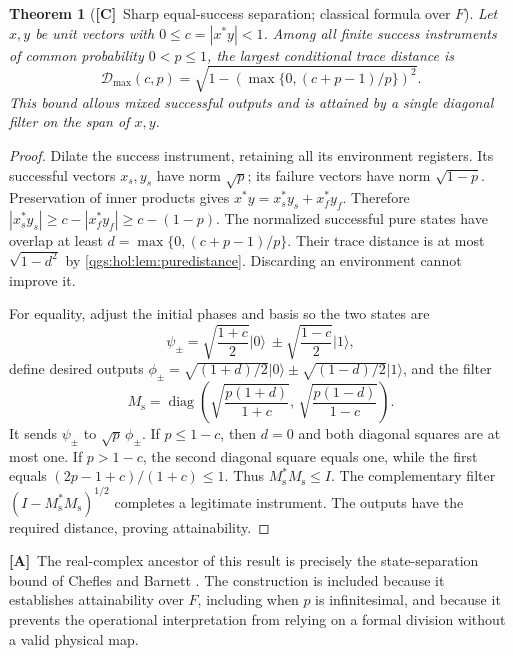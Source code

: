 \documentclass[11pt,oneside]{article}
\numberwithin{equation}{section}
\theoremstyle{plain}
\newtheorem{theorem}{Theorem}[section]
\theoremstyle{definition}
\theoremstyle{remark}
\newcommand{\TD}{\mathcal D}
\DeclareMathOperator{\diag}{diag}
\newcommand{\abs}[1]{\left|#1\right|}
\newcommand{\ket}[1]{\lvert#1\rangle}
\newcommand{\TC}{\textcolor{TierC}{\textsf{\bfseries[C]}}}
\newcommand{\TA}{\textcolor{TierA}{\textsf{\bfseries[A]}}}
\begin{document}
\begin{theorem}[\TC\ Sharp equal-success separation; classical formula over $F$]\label{qgs:hol:thm:separation}
Let $x,y$ be unit vectors with $0\leq c=\abs{x^*y}<1$. Among all finite success instruments of common probability $0<p\leq1$, the largest conditional trace distance is
\begin{equation}\label{qgs:hol:eq:sep}
 \TD_{\max}(c,p)=\sqrt{1-\left(\max\{0,(c+p-1)/p\}\right)^2}.
\end{equation}
This bound allows mixed successful outputs and is attained by a single diagonal filter on the span of $x,y$.
\end{theorem}
\begin{proof}
Dilate the success instrument, retaining all its environment registers. Its successful vectors $x_s,y_s$ have norm $\sqrt p$; its failure vectors have norm $\sqrt{1-p}$. Preservation of inner products gives $x^*y=x_s^*y_s+x_f^*y_f$. Therefore $\abs{x_s^*y_s}\geq c-\abs{x_f^*y_f}\geq c-(1-p)$. The normalized successful pure states have overlap at least $d=\max\{0,(c+p-1)/p\}$. Their trace distance is at most $\sqrt{1-d^2}$ by \cref{qgs:hol:lem:puredistance}. Discarding an environment cannot improve it.

For equality, adjust the initial phases and basis so the two states are
\[
 \psi_\pm=\sqrt{\frac{1+c}{2}}\ket0
 \ \pm\sqrt{\frac{1-c}{2}}\ket1,
\]
define desired outputs $\phi_\pm=\sqrt{(1+d)/2}\ket0\pm\sqrt{(1-d)/2}\ket1$, and the filter
\begin{equation}\label{qgs:hol:eq:filterK}
 M_{\mathrm{s}}=\diag\left(
 \sqrt{\frac{p(1+d)}{1+c}},\,
 \sqrt{\frac{p(1-d)}{1-c}}\right).
\end{equation}
It sends $\psi_\pm$ to $\sqrt p\,\phi_\pm$. If $p\leq1-c$, then $d=0$ and both diagonal squares are at most one. If $p>1-c$, the second diagonal square equals one, while the first equals $(2p-1+c)/(1+c)\leq1$. Thus $M_{\mathrm{s}}^*M_{\mathrm{s}}\leq I$. The complementary filter $(I-M_{\mathrm{s}}^*M_{\mathrm{s}})^{1/2}$ completes a legitimate instrument. The outputs have the required distance, proving attainability.
\end{proof}

\TA\ The real-complex ancestor of this result is precisely the state-separation bound of Chefles and Barnett \cite{CheflesBarnett}. The construction is included because it establishes attainability over $F$, including when $p$ is infinitesimal, and because it prevents the operational interpretation from relying on a formal division without a valid physical map.
\end{document}
